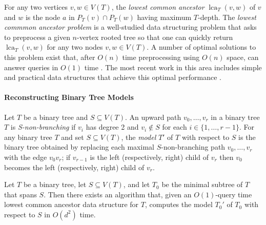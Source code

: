 \documentclass{patmorin}
\DeclareMathOperator{\lca}{lca}
\begin{document}
For any two vertices $v,w\in V(T)$, the \emph{lowest common ancestor} $\lca_T(v,w)$ of $v$ and $w$ is the node $a$ in $P_T(v)\cap P_T(w)$ having maximum $T$-depth.  The \emph{lowest commmon ancestor problem} is a well-studied data structuring problem that asks to preprocess a given $n$-vertex rooted tree so that one can quickly return $\lca_T(v,w)$ for any two nodes $v,w\in V(T)$. A number of optimal solutions to this problem exist that, after $O(n)$ time preprocessing using $O(n)$ space, can answer queries in $O(1)$ time \cite{berman.vishkin:recursive,shieber.vishkin:on,harel.tarjan:fast,alstrup.gavoille.ea:nearest,bender.farach-colton:lca,fischer.heun:theoretical}.  The most recent work in this area includes simple and practical data structures that achieve this optimal performance \cite{alstrup.gavoille.ea:nearest,bender.farach-colton:lca,fischer.heun:theoretical}.

\paragraph{Reconstructing Binary Tree Models}

Let $T$ be a binary tree and $S \subseteq V(T)$. An upward path $v_0,\ldots,v_r$ in a binary tree $T$ is \emph{S-non-branching} if $v_{i}$ has degree 2 and $v_i \notin S$ for each $i\in\{1,\ldots,r-1\}$. For any binary tree $T$ and set $S \subseteq V(T)$, the \emph{model} $T'$ of $T$ with respect to $S$ is the binary tree obtained by replacing each maximal $S$-non-branching path $v_0,\ldots,v_r$ with the edge $v_0v_r$; if $v_{r-1}$ is the left (respectively, right) child of $v_r$ then $v_0$ becomes the left (respectively, right) child of $v_r$.


\begin{lem}\label{reconstruction}
  Let $T$ be a binary tree, let $S\subseteq V(T)$, and let $T_0$ be the minimal subtree of $T$ that spans $S$. Then there exists an algorithm that, given an $O(1)$-query time lowest common ancestor data structure for $T$,  computes the model $T_0'$ of $T_0$ with respect to $S$ in $O(d^2)$ time.
\end{lem}
\end{document}
